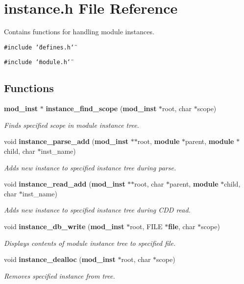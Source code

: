 \section{instance.h File Reference}
\label{instance_8h}
Contains functions for handling module instances. 


{\tt \#include \char`\"{}defines.h\char`\"{}}\par
{\tt \#include \char`\"{}module.h\char`\"{}}\par
\subsection*{Functions}
\begin{CompactItemize}
\item 
{\bf mod\_\-inst} $\ast$ {\bf instance\_\-find\_\-scope} ({\bf mod\_\-inst} $\ast$root, char $\ast$scope)
\begin{CompactList}\small\item\em Finds specified scope in module instance tree.\item\end{CompactList}\item 
void {\bf instance\_\-parse\_\-add} ({\bf mod\_\-inst} $\ast$$\ast$root, {\bf module} $\ast$parent, {\bf module} $\ast$child, char $\ast$inst\_\-name)
\begin{CompactList}\small\item\em Adds new instance to specified instance tree during parse.\item\end{CompactList}\item 
void {\bf instance\_\-read\_\-add} ({\bf mod\_\-inst} $\ast$$\ast$root, char $\ast$parent, {\bf module} $\ast$child, char $\ast$inst\_\-name)
\begin{CompactList}\small\item\em Adds new instance to specified instance tree during CDD read.\item\end{CompactList}\item 
void {\bf instance\_\-db\_\-write} ({\bf mod\_\-inst} $\ast$root, FILE $\ast${\bf file}, char $\ast$scope)
\begin{CompactList}\small\item\em Displays contents of module instance tree to specified file.\item\end{CompactList}\item 
void {\bf instance\_\-dealloc} ({\bf mod\_\-inst} $\ast$root, char $\ast$scope)
\begin{CompactList}\small\item\em Removes specified instance from tree.\item\end{CompactList}\end{CompactItemize}


